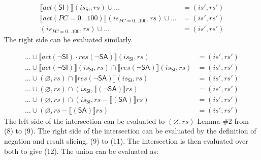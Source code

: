 \documentclass[12pt, letterpaper]{article}
\let\emptyset\varnothing
\newcommand\interp[1]{\llbracket #1 \rrbracket}
\begin{document}
 \par\nobreak
 {\fontsize{10pt}{12pt}\selectfont
 \begin{align}
     \interp{ \mathit{act} (\mathsf{SI}) } (\mathit{is_{\mathsf{SI}}}, \mathit{rs}) \cup \ldots
     &=
     (\mathit{is}', \mathit{rs}')
     \\
     \interp{ \mathit{act} (PC=0\ldots 100) } (\mathit{is_{PC=0\ldots100}}, \mathit{rs}) \cup \ldots %
     &=
     (\mathit{is}', \mathit{rs}')
     \\
     (\mathit{is_{PC=0\ldots100}}, \mathit{rs}) \cup \ldots 
     &=
     (\mathit{is}', \mathit{rs}')
 \end{align}
 }%
     The right side can be evaluated similarly.
 \par\nobreak
 {\fontsize{10pt}{12pt}\selectfont
 \begin{align}
     \ldots \cup %
     \interp{ \mathit{act}(\neg\mathsf{SI}) \cdot
      \mathit{res}(\neg\mathsf{SA}) } (\mathit{is_{\mathsf{SI}}}, \mathit{rs})
     &=
     (\mathit{is}', \mathit{rs}')
     \\
     \ldots \cup %
     \interp{ \mathit{act}(\neg\mathsf{SI}) } (\mathit{is_{\mathsf{SI}}}, \mathit{rs}) \cap
     \interp{ \mathit{res}(\neg\mathsf{SA}) } (\mathit{is_{\mathsf{SI}}}, \mathit{rs})
     &=
     (\mathit{is}', \mathit{rs}')
     \\
     \ldots \cup 
     (\emptyset, \mathit{rs}) \cap
     \interp{ \mathit{res}(\neg\mathsf{SA}) } (\mathit{is_{\mathsf{SI}}}, \mathit{rs})
     &=
     (\mathit{is}', \mathit{rs}')
     \\ %
     \ldots \cup 
     (\emptyset, \mathit{rs}) \cap
     (\mathit{is_{\mathsf{SI}}}, \interp{ (\neg\mathsf{SA}) } \mathit{rs})
     &=
     (\mathit{is}', \mathit{rs}')
     \\
     \ldots \cup 
     (\emptyset, \mathit{rs}) \cap
     (\mathit{is_{\mathsf{SI}}}, \mathit{rs} - \interp{ (\mathsf{SA}) } \mathit{rs})
     &=
     (\mathit{is}', \mathit{rs}') %
     \\
     \ldots \cup 
     (\emptyset, \mathit{rs} - \interp{ (\mathsf{SA}) } \mathit{rs})
     &=
     (\mathit{is}', \mathit{rs}')
 \end{align}
 }%
     The left side of the intersection can be evaluated to $(\emptyset, \mathit{rs})$ Lemma \#2 from (8) to (9). The right side of the intersection can be evaluated by the definition of negation and result slicing, (9) to (11).  The intersection is then evaluated over both to give (12).  The union can be evaluated as:
\end{document}
